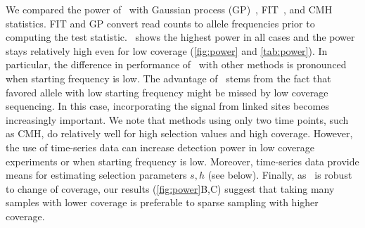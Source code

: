 We compared the power of \comale\ with Gaussian process
(GP)~\cite{Terhorst2015Multi}, FIT~\cite{feder2014Identifying}, and
CMH~\cite{agresti2011categorical} statistics.  FIT and GP convert read counts
to allele frequencies prior to computing the test statistic.  \comale\
shows the highest power in all cases and the power stays relatively
high even for low coverage (\ref{fig:power} and
\ref{tab:power}). In particular, the difference in performance
of \comale\ with other methods is pronounced when starting frequency
is low. 
The
advantage of \comale\ stems from the fact that favored allele with low
starting frequency might be missed by low coverage sequencing. In this
case, incorporating the signal from linked sites becomes increasingly
important. We note that methods using only two time points, such as
CMH, do relatively well for high selection values and high
coverage. However, the use of time-series data can increase detection
power in low coverage experiments or when starting frequency is
low. Moreover, time-series data provide means for estimating selection
parameters $s,h$ (see below). Finally, as \comale\ is robust to change
of coverage, our results (\ref{fig:power}B,C) suggest that taking
many samples with lower coverage is preferable to sparse sampling with
higher coverage.



